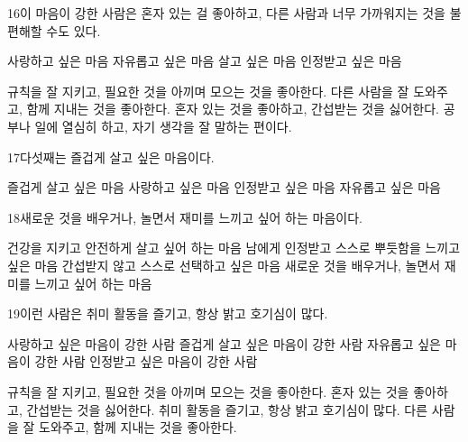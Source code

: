 \documentclass[fs85,seriesRus]{korfarm-base}
\begin{document}
\begin{kfSentenceUnit}{16}{이 마음이 강한 사람은 혼자 있는 걸 좋아하고, 다른 사람과 너무 가까워지는 것을 불편해할 수도 있다.}
\begin{kfChoices}
\kfChoice 사랑하고 싶은 마음
\kfChoice 자유롭고 싶은 마음
\kfChoice 살고 싶은 마음
\kfChoice 인정받고 싶은 마음
\end{kfChoices}
\begin{kfChoices}
\kfChoice 규칙을 잘 지키고, 필요한 것을 아끼며 모으는 것을 좋아한다.
\kfChoice 다른 사람을 잘 도와주고, 함께 지내는 것을 좋아한다.
\kfChoice 혼자 있는 것을 좋아하고, 간섭받는 것을 싫어한다.
\kfChoice 공부나 일에 열심히 하고, 자기 생각을 잘 말하는 편이다.
\end{kfChoices}
\end{kfSentenceUnit}

\begin{kfSentenceUnit}{17}{다섯째는 즐겁게 살고 싶은 마음이다.}
\begin{kfChoices}
\kfChoice 즐겁게 살고 싶은 마음
\kfChoice 사랑하고 싶은 마음
\kfChoice 인정받고 싶은 마음
\kfChoice 자유롭고 싶은 마음
\end{kfChoices}
\end{kfSentenceUnit}

\begin{kfSentenceUnit}{18}{새로운 것을 배우거나, 놀면서 재미를 느끼고 싶어 하는 마음이다.}
\begin{kfChoices}
\kfChoice 건강을 지키고 안전하게 살고 싶어 하는 마음
\kfChoice 남에게 인정받고 스스로 뿌듯함을 느끼고 싶은 마음
\kfChoice 간섭받지 않고 스스로 선택하고 싶은 마음
\kfChoice 새로운 것을 배우거나, 놀면서 재미를 느끼고 싶어 하는 마음
\end{kfChoices}
\end{kfSentenceUnit}

\begin{kfSentenceUnit}{19}{이런 사람은 취미 활동을 즐기고, 항상 밝고 호기심이 많다.}
\begin{kfChoices}
\kfChoice 사랑하고 싶은 마음이 강한 사람
\kfChoice 즐겁게 살고 싶은 마음이 강한 사람
\kfChoice 자유롭고 싶은 마음이 강한 사람
\kfChoice 인정받고 싶은 마음이 강한 사람
\end{kfChoices}
\begin{kfChoices}
\kfChoice 규칙을 잘 지키고, 필요한 것을 아끼며 모으는 것을 좋아한다.
\kfChoice 혼자 있는 것을 좋아하고, 간섭받는 것을 싫어한다.
\kfChoice 취미 활동을 즐기고, 항상 밝고 호기심이 많다.
\kfChoice 다른 사람을 잘 도와주고, 함께 지내는 것을 좋아한다.
\end{kfChoices}
\end{kfSentenceUnit}
\end{document}
